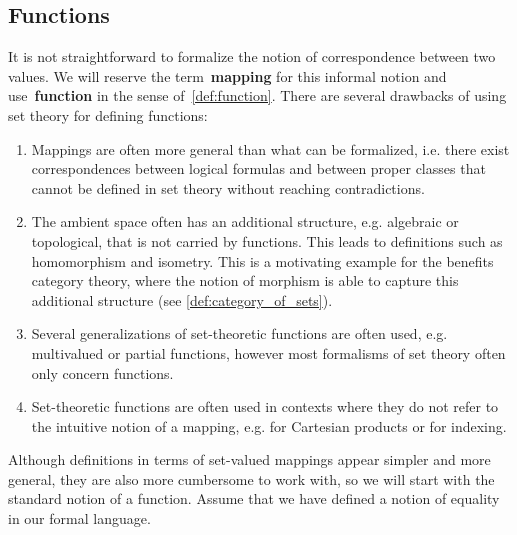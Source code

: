 \subsection{Functions}\label{subsec:functions}

It is not straightforward to formalize the notion of correspondence between two values. We will reserve the term~\textbf{mapping} for this informal notion and use~\textbf{function} in the sense of~\cref{def:function}. There are several drawbacks of using set theory for defining functions:
\begin{enumerate}
  \item Mappings are often more general than what can be formalized, i.e. there exist correspondences between logical formulas and between proper classes that cannot be defined in set theory without reaching contradictions.
  \item The ambient space often has an additional structure, e.g. algebraic or topological, that is not carried by functions. This leads to definitions such as homomorphism and isometry. This is a motivating example for the benefits category theory, where the notion of morphism is able to capture this additional structure (see \cref{def:category_of_sets}).
  \item Several generalizations of set-theoretic functions are often used, e.g. multivalued or partial functions, however most formalisms of set theory often only concern functions.
  \item Set-theoretic functions are often used in contexts where they do not refer to the intuitive notion of a mapping, e.g. for Cartesian products or for indexing.
\end{enumerate}

Although definitions in terms of set-valued mappings appear simpler and more general, they are also more cumbersome to work with, so we will start with the standard notion of a function. Assume that we have defined a notion of equality in our formal language.

